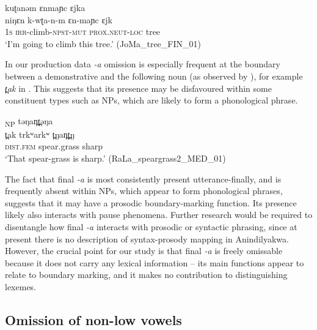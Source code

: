 \documentclass[output=paper,colorlinks,citecolor=brown]{langscibook}
\begin{document}
\ea\label{ex:mansfield:2}
 {kuʈanəm} {ɛnmaɲc} {ɛjka} \\
       niŋɛn k-wʈa-n-m ɛn-maɲc ɛjk\\
       \textsc{1s} \textsc{irr}{}-climb-\textsc{npst-mut} \textsc{prox.neut-loc} tree\\
\glt   ‘I’m going to climb this tree.’ (JoMa\_tree\_FIN\_01)\z


In our production data \textit{{}-a} omission is especially frequent at the boundary between a demonstrative and the following noun (as observed by \citealt{Heath:2020aa}), for example \textit{t̪ak} in . This suggests that its presence may be disfavoured within some constituent types such as NPs, which are likely to form a phonological phrase. 

\ea\label{ex:mansfield:3}
\glll [{t̪ak} {t̪urkʷarəkʷa}]\textsubscript{NP} {təŋan̪t̪əŋa}\\
       {\db}t̪ak trkʷarkʷ t̪ŋan̪t̪ŋ\\
       \textsc{dist.fem} spear.grass sharp\\
\glt   ‘That spear-grass is sharp.’ (RaLa\_speargrass2\_MED\_01)\z

The fact that final \textit{{}-a} is most consistently present utterance-finally, and is frequently absent within NPs, which appear to form phonological phrases, suggests that it may have a prosodic boundary-marking function. Its presence likely also interacts with pause phenomena. Further research would be required to disentangle how final \textit{{}-a} interacts with prosodic or syntactic phrasing, since at present there is no description of syntax-prosody mapping in Anindilyakwa. However, the crucial point for our study is that final \textit{{}-a} is freely omissable because it does not carry any lexical information – its main functions appear to relate to boundary marking, and it makes no contribution to distinguishing lexemes.


\subsection{Omission of non-low vowels}\label{sec:mansfield:5.3}
\end{document}
